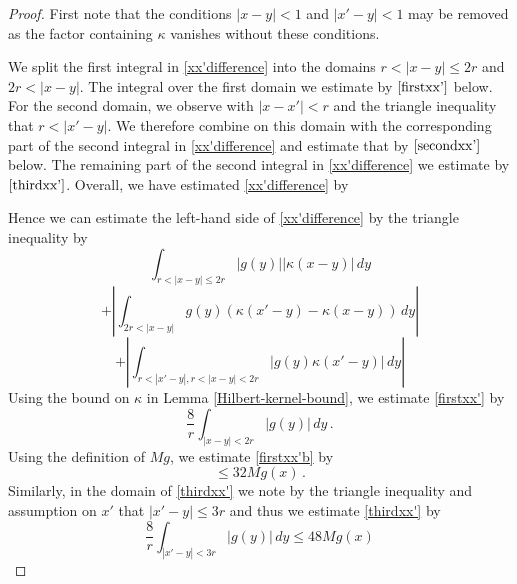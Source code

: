 {\begin{proof}
First note that the
conditions $|x-y|<1$
and $|x'-y|<1$ may be removed as the factor containing $\kappa$
vanishes without these conditions.

We split the first integral in \eqref{xx'difference}
into the domains $r<|x-y|\le 2r$
and $2r<|x-y|$. The integral over the first domain we estimate
by $\eqref{firstxx'}$ below.
For the second domain, we
observe with $|x-x'|<r$ and the triangle inequality that $r<|x'-y|$. We therefore combine on this domain with the
corresponding part of the second integral in \eqref{xx'difference} and estimate that by $\eqref{secondxx'}$
below. The remaining part of the second integral in
\eqref{xx'difference} we estimate by $\eqref{thirdxx'}$.
Overall, we have estimated \eqref{xx'difference}
by

Hence we can estimate the left-hand side of \eqref{xx'difference}
by the triangle inequality by
\begin{equation}
\label{firstxx'}
\int_{r<|x-y|\le 2r}
|g(y)| |\kappa(x-y)|\, dy
\end{equation}
\begin{equation}\label{secondxx'}
  +  \left|\int_{2r<|x-y|}
g(y) (\kappa(x'-y)-\kappa(x-y))\, dy
\right|
\end{equation}
\begin{equation}
\label{thirdxx'}
  +\left|\int_{r<|x'-y|, r<|x-y|<2r}
|g(y) \kappa(x'-y)|\, dy
\right|
\end{equation}
Using the bound on $\kappa$ in Lemma \ref{Hilbert-kernel-bound}, we estimate
\eqref{firstxx'} by
\begin{equation}
\label{firstxx'b}
 \frac 8 r\int_{|x-y|<2r}
|g(y)|\, dy\, .
\end{equation}
Using the definition of $Mg$, we estimate
\eqref{firstxx'b} by
\begin{equation}
\label{firstxx'c}
 \le 32{Mg(x)}\, .
\end{equation}
Similarly, in the domain of \eqref{thirdxx'}
we note by the triangle inequality
and assumption on $x'$ that $|x'-y|\le 3r$ and thus we estimate
\eqref{thirdxx'}
by
\begin{equation}
\label{thirdxx'b}
 \frac 8{r}\int_{|x'-y|<3r}
|g(y)| \, dy\le 48 Mg(x)
\end{equation}


\end{proof}}
